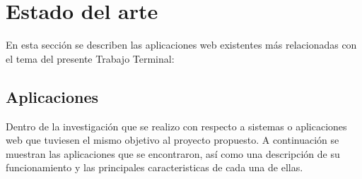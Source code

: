 \chapter{Estado del arte}
	
	
	En esta sección se describen las aplicaciones web existentes más relacionadas con el tema del presente Trabajo Terminal:
	
	
	
	
	\section{Aplicaciones}
	Dentro de la investigación que se realizo con respecto a sistemas o aplicaciones web que tuviesen el mismo objetivo al proyecto propuesto. A continuación se muestran las aplicaciones que se encontraron, así como una descripción de su funcionamiento y las principales caracteristicas de cada una de ellas.
